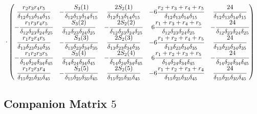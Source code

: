 \documentclass[12pt,a4paper]{article}
\begin{document}
\begin{align}
&\cdot \left(\begin{matrix}\cfrac{r_2 r_3 r_4 r_5}{\delta_{12}\delta_{13}\delta_{14}\delta_{15}} & -\cfrac{S_3(1)}{\delta_{12}\delta_{13}\delta_{14}\delta_{15}} & \cfrac{2S_2(1)}{\delta_{12}\delta_{13}\delta_{14}\delta_{15}}  & -6\cfrac{r_2 + r_3 + r_4 + r_5}{\delta_{12}\delta_{13}\delta_{14}\delta_{15}} & \cfrac{24}{\delta_{12}\delta_{13}\delta_{14}\delta_{15}}  \\ -\cfrac{r_1 r_3 r_4 r_5}{\delta_{12}\delta_{23}\delta_{24}\delta_{25}} & \cfrac{S_3(2)}{\delta_{12}\delta_{23}\delta_{24}\delta_{25}} & -\cfrac{2S_2(2)}{\delta_{12}\delta_{23}\delta_{24}\delta_{25}}  & 6\cfrac{r_1 + r_3 + r_4 + r_5}{\delta_{12}\delta_{23}\delta_{24}\delta_{25}} & -\cfrac{24}{\delta_{12}\delta_{23}\delta_{24}\delta_{25}} \\ \cfrac{r_1 r_2 r_4 r_5}{\delta_{13}\delta_{23}\delta_{34}\delta_{35}} & -\cfrac{S_3(3)}{\delta_{13}\delta_{23}\delta_{34}\delta_{35}} & \cfrac{2S_2(3)}{\delta_{13}\delta_{23}\delta_{34}\delta_{35}}  & -6\cfrac{r_1 + r_2 + r_4 + r_5}{\delta_{13}\delta_{23}\delta_{34}\delta_{35}} & \cfrac{24}{\delta_{13}\delta_{23}\delta_{34}\delta_{35}} \\ -\cfrac{r_1 r_2 r_3 r_5}{\delta_{14}\delta_{24}\delta_{34}\delta_{45}} & \cfrac{S_3(4)}{\delta_{14}\delta_{24}\delta_{34}\delta_{45}} & -\cfrac{2S_2(4)}{\delta_{14}\delta_{24}\delta_{34}\delta_{45}}  & 6\cfrac{r_1 + r_2 + r_3 + r_5}{\delta_{14}\delta_{24}\delta_{34}\delta_{45}} & - \cfrac{24}{\delta_{14}\delta_{24}\delta_{34}\delta_{45}} \\ \cfrac{r_1 r_2 r_3 r_4}{\delta_{15}\delta_{25}\delta_{35}\delta_{45}} & -\cfrac{S_3(5)}{\delta_{15}\delta_{25}\delta_{35}\delta_{45}} & \cfrac{2S_2(5)}{\delta_{15}\delta_{25}\delta_{35}\delta_{45}}  & -6\cfrac{r_1 + r_2 + r_3 + r_4}{\delta_{15}\delta_{25}\delta_{35}\delta_{45}} & \cfrac{24}{\delta_{15}\delta_{25}\delta_{35}\delta_{45}} \end{matrix}\right)
\end{align}

\subsection{Companion Matrix $5$}
\end{document}
